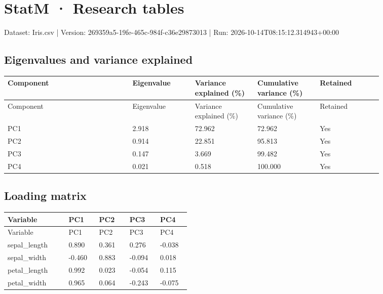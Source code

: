 \documentclass[UTF8]{ctexart}
\begin{document}
\section*{StatM · Research tables}
Dataset: Iris.csv | Version: 269359a5-19fe-465c-984f-c36e29873013 | Run: 2026-10-14T08:15:12.314943+00:00\par
{}
\subsection*{Eigenvalues and variance explained}
\small
\setlength{\tabcolsep}{2pt}
\begin{longtable}{p{0.2867\linewidth}p{0.1433\linewidth}p{0.1433\linewidth}p{0.1433\linewidth}p{0.1433\linewidth}}
\toprule
Component & Eigenvalue & Variance explained (\%) & Cumulative variance (\%) & Retained \\
\midrule
\endfirsthead
\toprule
Component & Eigenvalue & Variance explained (\%) & Cumulative variance (\%) & Retained \\
\midrule
\endhead
PC1 & 2.918 & 72.962 & 72.962 & Yes \\
PC2 & 0.914 & 22.851 & 95.813 & Yes \\
PC3 & 0.147 & 3.669 & 99.482 & Yes \\
PC4 & 0.021 & 0.518 & 100.000 & Yes \\
\bottomrule
\end{longtable}
\subsection*{Loading matrix}
\small
\setlength{\tabcolsep}{2pt}
\begin{longtable}{p{0.2867\linewidth}p{0.1433\linewidth}p{0.1433\linewidth}p{0.1433\linewidth}p{0.1433\linewidth}}
\toprule
Variable & PC1 & PC2 & PC3 & PC4 \\
\midrule
\endfirsthead
\toprule
Variable & PC1 & PC2 & PC3 & PC4 \\
\midrule
\endhead
sepal\_length & 0.890 & 0.361 & 0.276 & -0.038 \\
sepal\_width & -0.460 & 0.883 & -0.094 & 0.018 \\
petal\_length & 0.992 & 0.023 & -0.054 & 0.115 \\
petal\_width & 0.965 & 0.064 & -0.243 & -0.075 \\
\bottomrule
\end{longtable}
\end{document}
